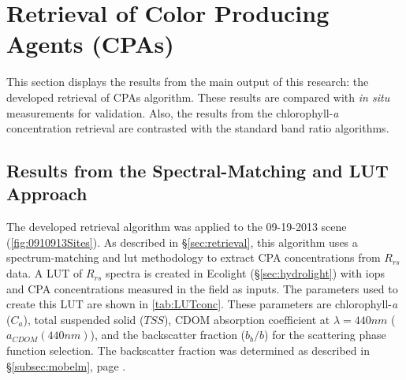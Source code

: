 \section{Retrieval of Color Producing Agents (CPAs)}
\label{sec:Results_CPAretrieval}
This section displays the results from the main output of this research: the developed retrieval of CPAs algorithm. These results are compared with {\it in situ} measurements for validation. Also, the results from the chlorophyll-{\it a} concentration retrieval are contrasted with the standard band ratio algorithms. 

\subsection{Results from the Spectral-Matching and LUT Approach}
\label{subsec:LUTapproach}
The developed retrieval algorithm \cite{Concha2013IGARSS} was applied to the 09-19-2013 scene (\autoref{fig:0910913Sites}). As described in \S\ref{sec:retrieval}, this algorithm uses a spectrum-matching and \gls{lut} methodology to extract CPA concentrations from $R_{rs}$ data. A LUT of $R_{rs}$ spectra is created in Ecolight (\S\ref{sec:hydrolight}) with \gls{iops} and CPA concentrations measured in the field as inputs. The parameters used to create this LUT are shown in \autoref{tab:LUTconc}. These parameters are chlorophyll-{\it a} ($C_a$), total suspended solid ($TSS$), CDOM absorption coefficient at $\lambda=440nm$ ($a_{CDOM}(440nm)$), and the backscatter fraction ($b_b/b$) for the scattering phase function selection. The backscatter fraction was determined as described in \S\ref{subsec:mobelm}, page \pageref{pag:phasefn}.

